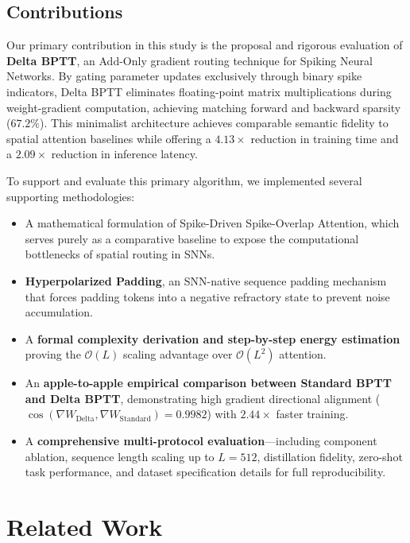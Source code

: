 \documentclass[10pt]{article} %
\begin{document}
\subsection{Contributions}
Our primary contribution in this study is the proposal and rigorous evaluation of \textbf{Delta BPTT}, an Add-Only gradient routing technique for Spiking Neural Networks. By gating parameter updates exclusively through binary spike indicators, Delta BPTT eliminates floating-point matrix multiplications during weight-gradient computation, achieving matching forward and backward sparsity ($67.2\%$). This minimalist architecture achieves comparable semantic fidelity to spatial attention baselines while offering a $4.13\times$ reduction in training time and a $2.09\times$ reduction in inference latency.

To support and evaluate this primary algorithm, we implemented several supporting methodologies:
\begin{itemize}
    \item A mathematical formulation of Spike-Driven Spike-Overlap Attention, which serves purely as a comparative baseline to expose the computational bottlenecks of spatial routing in SNNs.
    \item \textbf{Hyperpolarized Padding}, an SNN-native sequence padding mechanism that forces padding tokens into a negative refractory state to prevent noise accumulation.
    \item A \textbf{formal complexity derivation and step-by-step energy estimation} proving the $\mathcal{O}(L)$ scaling advantage over $\mathcal{O}(L^2)$ attention.
    \item An \textbf{apple-to-apple empirical comparison between Standard BPTT and Delta BPTT}, demonstrating high gradient directional alignment ($\cos(\nabla W_{\text{Delta}}, \nabla W_{\text{Standard}}) = 0.9982$) with $2.44\times$ faster training.
    \item A \textbf{comprehensive multi-protocol evaluation}---including component ablation, sequence length scaling up to $L=512$, distillation fidelity, zero-shot task performance, and dataset specification details for full reproducibility.
\end{itemize}

\section{Related Work}
\end{document}
